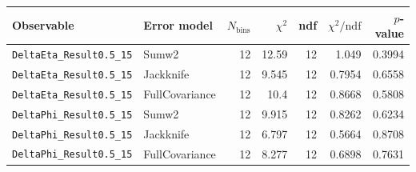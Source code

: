 \begin{tabular}{|l|l|r|r|r|r|r|}
\hline
Observable & Error model & $N_{\mathrm{bins}}$ & $\chi^2$ & ndf & $\chi^2/\mathrm{ndf}$ & $p$-value \\
\hline
\texttt{DeltaEta\_Result0.5\_15} & Sumw2 & 12 & 12.59 & 12 & 1.049 & 0.3994 \\
\texttt{DeltaEta\_Result0.5\_15} & Jackknife & 12 & 9.545 & 12 & 0.7954 & 0.6558 \\
\texttt{DeltaEta\_Result0.5\_15} & FullCovariance & 12 & 10.4 & 12 & 0.8668 & 0.5808 \\
\texttt{DeltaPhi\_Result0.5\_15} & Sumw2 & 12 & 9.915 & 12 & 0.8262 & 0.6234 \\
\texttt{DeltaPhi\_Result0.5\_15} & Jackknife & 12 & 6.797 & 12 & 0.5664 & 0.8708 \\
\texttt{DeltaPhi\_Result0.5\_15} & FullCovariance & 12 & 8.277 & 12 & 0.6898 & 0.7631 \\
\hline
\end{tabular}
